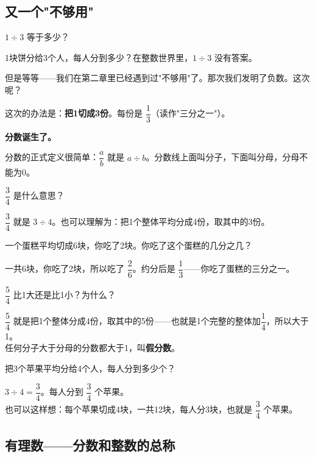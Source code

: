 \subsection*{又一个"不够用"}

$1\div3$ 等于多少？

1块饼分给3个人，每人分到多少？在整数世界里，$1\div3$ 没有答案。

但是等等——我们在第二章里已经遇到过"不够用"了。那次我们发明了负数。这次呢？

这次的办法是：\textbf{把1切成3份}。每份是 $\dfrac{1}{3}$（读作"三分之一"）。

\textbf{分数诞生了。}

分数的正式定义很简单：$\dfrac{a}{b}$ 就是 $a\div b$。分数线上面叫分子，下面叫分母，分母不能为0。

\begin{example}
$\dfrac{3}{4}$ 是什么意思？
\end{example}
\begin{solution}
$\dfrac{3}{4}$ 就是 $3\div4$。也可以理解为：把1个整体平均分成4份，取其中的3份。
\end{solution}

\begin{example}
一个蛋糕平均切成6块，你吃了2块。你吃了这个蛋糕的几分之几？
\end{example}
\begin{solution}
一共6块，你吃了2块，所以吃了 $\dfrac{2}{6}$。约分后是 $\dfrac{1}{3}$——你吃了蛋糕的三分之一。
\end{solution}

\begin{example}
$\dfrac{5}{4}$ 比1大还是比1小？为什么？
\end{example}
\begin{solution}
$\dfrac{5}{4}$ 就是把1个整体分成4份，取其中的5份——也就是1个完整的整体加$\dfrac{1}{4}$，所以大于1。\\
任何分子大于分母的分数都大于1，叫\textbf{假分数}。
\end{solution}

\begin{example}
把3个苹果平均分给4个人，每人分到多少个？
\end{example}
\begin{solution}
$3\div4 = \dfrac{3}{4}$。每人分到 $\dfrac{3}{4}$ 个苹果。\\
也可以这样想：每个苹果切成4块，一共12块，每人分3块，也就是 $\dfrac{3}{4}$ 个苹果。
\end{solution}

\subsection*{有理数——分数和整数的总称}

